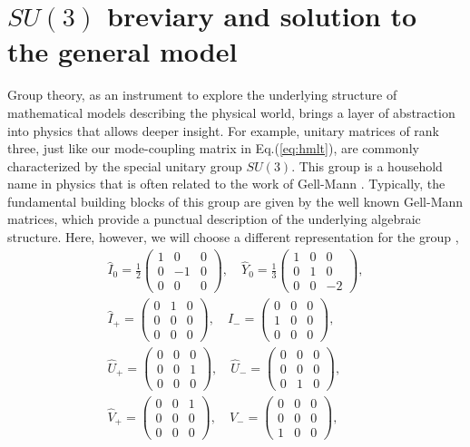 \documentclass[9pt,twocolumn,twoside]{osajnl}
\begin{document}
\section{$SU(3)$ breviary and solution to the general model}

Group theory, as an instrument to explore the underlying structure of mathematical models describing the physical world, brings a layer of abstraction into physics that allows deeper insight.
For example, unitary matrices of rank three, just like our mode-coupling matrix in Eq.(\ref{eq:hmlt}), are commonly characterized by the special unitary group $SU(3)$.
This group is a household name in physics that is often related to the work of Gell-Mann \cite{GellMann1961}.
Typically, the fundamental building blocks of this group are given by the well known Gell-Mann matrices, which provide a punctual description of the underlying algebraic structure.
Here, however, we will choose a different representation for the group \cite{Ticciati1999}, 
\begin{eqnarray}
\hat{I}_{0} = \frac{1}{2} \left( \begin{array}{ccc} 1&0&0\\0&-1&0\\0&0&0 \end{array}\right), \quad  
\hat{Y}_{0} = \frac{1}{3} \left( \begin{array}{ccc} 
1&0&0\\0&1&0\\0&0&-2    \end{array}\right), \nonumber\\
\hat{I}_{+} = \left( \begin{array}{ccc} 0&1&0\\0&0&0\\0&0&0 \end{array}\right), \quad 
\hat{I}_{-} = \left( \begin{array}{ccc} 0&0&0\\1&0&0\\0&0&0 \end{array}\right), \quad \nonumber\\
\hat{U}_{+} = \left( \begin{array}{ccc} 0&0&0\\0&0&1\\0&0&0 \end{array}\right), \quad 
\hat{U}_{-} = \left( \begin{array}{ccc} 0&0&0\\0&0&0\\0&1&0 \end{array}\right), \quad \nonumber \\
\hat{V}_{+} = \left( \begin{array}{ccc} 0&0&1\\0&0&0\\0&0&0 \end{array}\right), \quad 
\hat{V}_{-} = \left( \begin{array}{ccc} 0&0&0\\0&0&0\\1&0&0 \end{array}\right), \label{eq:gens}
\end{eqnarray}
\end{document}
